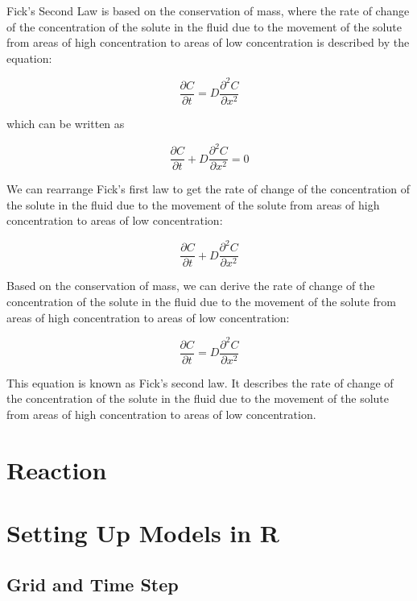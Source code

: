 \documentclass{tufte-handout}\usepackage[]{graphicx}\usepackage[]{xcolor}
\begin{document}
Fick's Second Law is based on the conservation of mass, where the rate of change of the concentration of the solute in the fluid due to the movement of the solute from areas of high concentration to areas of low concentration is described by the equation:

\begin{equation}
  \frac{\partial C}{\partial t} = D \frac{\partial^2 C}{\partial x^2}
\end{equation}

which can be written as 

\begin{equation}
  \frac{\partial C}{\partial t} + D \frac{\partial^2 C}{\partial x^2} = 0
\end{equation}



We can rearrange Fick's first law to get the rate of change of the concentration of the solute in the fluid due to the movement of the solute from areas of high concentration to areas of low concentration:

\begin{equation}
  \frac{\partial C}{\partial t} + D \frac{\partial^2 C}{\partial x^2}
\end{equation}


Based on the conservation of mass, we can derive the rate of change of the concentration of the solute in the fluid due to the movement of the solute from areas of high concentration to areas of low concentration:


\begin{equation}
  \frac{\partial C}{\partial t} = D \frac{\partial^2 C}{\partial x^2}
\end{equation}

This equation is known as Fick's second law. It describes the rate of change of the concentration of the solute in the fluid due to the movement of the solute from areas of high concentration to areas of low concentration.


\section{Reaction}



\section{Setting Up Models in R}

\subsection{Grid and Time Step}
\end{document}

